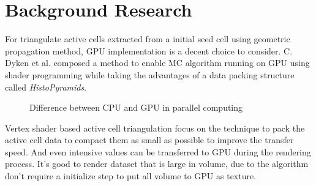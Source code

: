 \documentclass[11pt, b5paper]{report}
\begin{document}
\section{Background Research}




For triangulate active cells extracted from a initial seed cell using geometric
propagation method, GPU implementation is a decent choice to consider. C. Dyken
et al.\cite{dyken2008high} composed a method to enable MC algorithm running
on GPU using shader programming while taking the advantages of a data packing
structure called \emph{HistoPyramids}. 

\begin{figure}[htb]
  \centering
  \caption{Difference between CPU and GPU in parallel computing}
  \label{fig:cudaintro}
\end{figure}


Vertex shader based active cell triangulation \cite{goetz2005real} focus
on the technique to pack the active cell data to compact them as small as
possible to improve the transfer speed. And even intensive values can be
transferred to GPU during the rendering process. It's good to render dataset
that is large in volume, due to the algorithm don't require a initialize
step to put all volume to GPU as texture.
\end{document}
